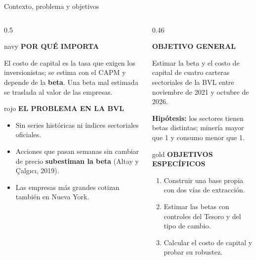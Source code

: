 \documentclass[aspectratio=169,10pt]{beamer}
\newcommand{\etiqueta}[2]{{\color{#1}\scriptsize\bfseries\MakeUppercase{#2}}\par\vspace{1mm}}
\begin{document}
\begin{frame}{Contexto, problema y objetivos}
\begin{columns}[T]
\begin{column}{0.5\textwidth}
\begin{caja}{navy}
\etiqueta{navy}{Por qué importa}
El costo de capital es la tasa que exigen los inversionistas; se estima con el CAPM y depende de la \textbf{beta}. Una beta mal estimada se traslada al valor de las empresas.
\end{caja}
\vspace{1mm}
\begin{caja}{rojo}
\etiqueta{rojo}{El problema en la BVL}
\begin{itemize}\setlength{\itemsep}{0.4mm}
\item Sin series históricas ni índices sectoriales oficiales.
\item Acciones que pasan semanas sin cambiar de precio \textbf{subestiman la beta} (Altay y Çalgıcı, 2019).
\item Las empresas más grandes cotizan también en Nueva York.
\end{itemize}
\end{caja}
\end{column}
\begin{column}{0.46\textwidth}
\begin{clave}
\etiqueta{acento}{Objetivo general}
Estimar la beta y el costo de capital de cuatro carteras sectoriales de la BVL entre noviembre de 2021 y octubre de 2026.\par\vspace{0.8mm}
{\color{acento}\bfseries Hipótesis:} los sectores tienen betas distintas; minería mayor que 1 y consumo menor que 1.
\end{clave}
\vspace{1mm}
\begin{caja}{gold}
\etiqueta{gold!80!black}{Objetivos específicos}
\begin{enumerate}\setlength{\itemsep}{0.4mm}
\item Construir una base propia con dos vías de extracción.
\item Estimar las betas con controles del Tesoro y del tipo de cambio.
\item Calcular el costo de capital y probar su robustez.
\end{enumerate}
\end{caja}
\end{column}
\end{columns}
\end{frame}
\end{document}
